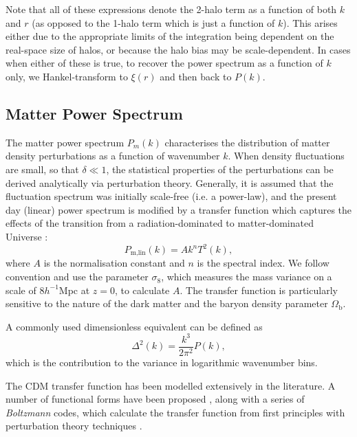 \documentclass[5p,aas_macros]{elsarticle}
\begin{document}
Note that all of these expressions denote the 2-halo term as a function of both $k$ and $r$ (as opposed to the 1-halo term which is just a function of $k$). 
This arises either due to the appropriate limits of the integration being dependent on the real-space size of halos, or because the halo bias may be scale-dependent. 
In cases when either of these is true, to recover the power spectrum as a function of $k$ only, we Hankel-transform to $\xi(r)$ and then back to $P(k)$.


\subsection{Matter Power Spectrum}
\label{sec:powerspec}
The matter power spectrum $P_m(k)$ characterises the distribution of matter 
density perturbations as a function of wavenumber $k$.
When density fluctuations are small, so that $\delta \ll 1$, the statistical properties of the perturbations can be derived analytically via perturbation theory. 
Generally, it is assumed that the fluctuation spectrum was initially scale-free (i.e. a power-law), and the present day (linear) power spectrum is modified by a transfer function which captures the effects of the transition from a radiation-dominated to matter-dominated Universe \citep{Bond1984}:
\begin{equation}
	\label{eq:powerfromtransfer}
	P_\text{m,lin}(k) = Ak^n T^2(k),
\end{equation}
where $A$ is the normalisation constant and $n$ is the spectral index. 
We follow convention and use the
parameter $\sigma_8$, which measures the mass variance on a scale of $8 h^{-1}$Mpc at $z=0$, 
to calculate $A$. The transfer function is particularly sensitive to the nature of
the dark matter and the baryon density parameter $\Omega_\text{b}$.

A commonly used dimensionless equivalent can be defined as 
\begin{equation}
    \Delta^2(k) = \frac{k^3}{2\pi^2} P(k),
\end{equation}
which is the contribution to the variance in logarithmic wavenumber bins.

The CDM transfer function has been modelled extensively in the literature. 
A number of functional forms have been proposed \citep[][hereafter EH]{Bond1984,Bardeen1986,Eisenstein1998}, along with a series of \textit{Boltzmann} codes, which calculate the transfer function from first principles with perturbation theory techniques \citep{Zaldarriaga2000,Lewis2000,Blas2011}. 
\end{document}
